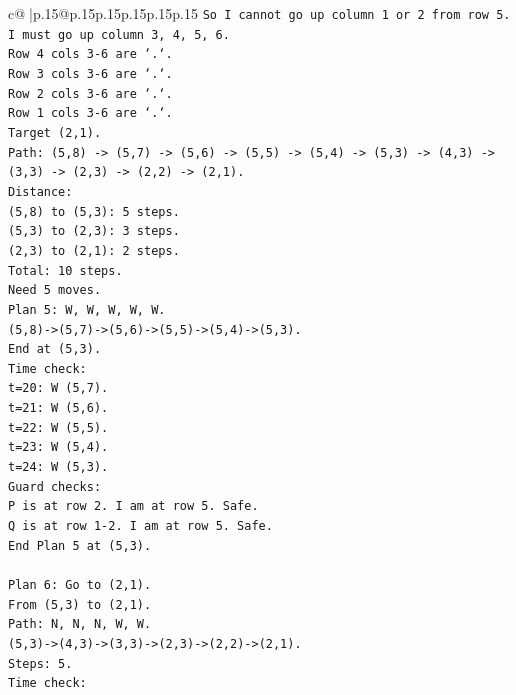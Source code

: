 \documentclass{article}
\begin{document}
{\begin{supertabular}{c@{$\;$}|p{.15\linewidth}@{}p{.15\linewidth}p{.15\linewidth}p{.15\linewidth}p{.15\linewidth}p{.15\linewidth}}
{{{\texttt{So I cannot go up column 1 or 2 from row 5.} \\
\texttt{I must go up column 3, 4, 5, 6.} \\
\texttt{Row 4 cols 3{-}6 are `.`.} \\
\texttt{Row 3 cols 3{-}6 are `.`.} \\
\texttt{Row 2 cols 3{-}6 are `.`.} \\
\texttt{Row 1 cols 3{-}6 are `.`.} \\
\texttt{Target (2,1).} \\
\texttt{Path: (5,8) {-}> (5,7) {-}> (5,6) {-}> (5,5) {-}> (5,4) {-}> (5,3) {-}> (4,3) {-}> (3,3) {-}> (2,3) {-}> (2,2) {-}> (2,1).} \\
\texttt{Distance:} \\
\texttt{(5,8) to (5,3): 5 steps.} \\
\texttt{(5,3) to (2,3): 3 steps.} \\
\texttt{(2,3) to (2,1): 2 steps.} \\
\texttt{Total: 10 steps.} \\
\texttt{Need 5 moves.} \\
\texttt{Plan 5: W, W, W, W, W.} \\
\texttt{(5,8){-}>(5,7){-}>(5,6){-}>(5,5){-}>(5,4){-}>(5,3).} \\
\texttt{End at (5,3).} \\
\texttt{Time check:} \\
\texttt{t=20: W (5,7).} \\
\texttt{t=21: W (5,6).} \\
\texttt{t=22: W (5,5).} \\
\texttt{t=23: W (5,4).} \\
\texttt{t=24: W (5,3).} \\
\texttt{Guard checks:} \\
\texttt{P is at row 2. I am at row 5. Safe.} \\
\texttt{Q is at row 1{-}2. I am at row 5. Safe.} \\
\texttt{End Plan 5 at (5,3).} \\
\\ 
\texttt{Plan 6: Go to (2,1).} \\
\texttt{From (5,3) to (2,1).} \\
\texttt{Path: N, N, N, W, W.} \\
\texttt{(5,3){-}>(4,3){-}>(3,3){-}>(2,3){-}>(2,2){-}>(2,1).} \\
\texttt{Steps: 5.} \\
\texttt{Time check:} \\
}}}
\end{supertabular}}
\end{document}
